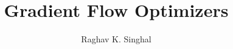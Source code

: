 \documentclass[12pt,twoside]{article}
\begin{document}
\title{Gradient Flow Optimizers}
\author{Raghav K. Singhal}
\maketitle









% 


\end{document}
